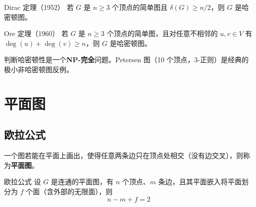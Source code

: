 \begin{myTheorem}{Dirac 定理（1952）}
若 $G$ 是 $n \geq 3$ 个顶点的简单图且 $\delta(G) \geq n/2$，则 $G$ 是哈密顿图。
\end{myTheorem}

\begin{myTheorem}{Ore 定理（1960）}
若 $G$ 是 $n \geq 3$ 个顶点的简单图，且对任意不相邻的 $u, v \in V$ 有 $\deg(u) + \deg(v) \geq n$，则 $G$ 是哈密顿图。
\end{myTheorem}

\begin{center}
\end{center}

\begin{remark}
判断哈密顿性是一个\textbf{NP-完全}问题。Petersen 图（10 个顶点，3-正则）是经典的极小非哈密顿图反例。
\end{remark}

\section{平面图}

\subsection{欧拉公式}

\begin{mydefinition}{}
一个图若能在平面上画出，使得任意两条边只在顶点处相交（没有边交叉），则称为\textbf{平面图}。
\end{mydefinition}

\begin{myTheorem}{欧拉公式}
设 $G$ 是连通的平面图，有 $n$ 个顶点、$m$ 条边，且其平面嵌入将平面划分为 $f$ 个面（含外部的无限面），则
\[
\boxed{n - m + f = 2}
\]
\end{myTheorem}

